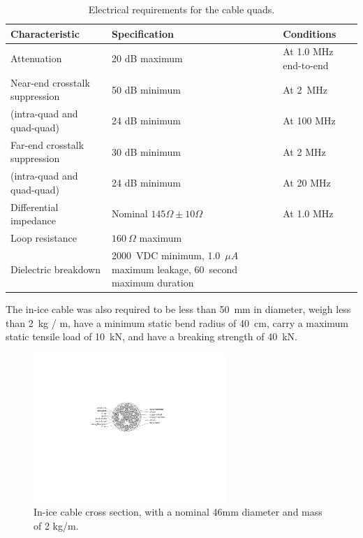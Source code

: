 \begin{table}[h]
  \centering
  \caption{Electrical requirements for the cable quads.} 
  \begin{tabularx}{\textwidth}{ l X  X  }
    \toprule
    Characteristic& Specification & Conditions \\
    \midrule

    Attenuation & 20 dB maximum & At 1.0 MHz end-to-end \\
%

   Near-end crosstalk suppression& 50 dB minimum & At 2~MHz \\
(intra-quad and quad-quad)&24 dB minimum& At 100 MHz\\
   Far-end crosstalk suppression& 30 dB minimum & At 2 MHz \\
(intra-quad and quad-quad)&24 dB minimum& At 20 MHz\\


    Differential impedance & Nominal $145\Omega \pm 10\Omega$ & At 1.0 MHz \\

    Loop resistance & $160~\Omega$ maximum & \\

    Dielectric breakdown & 2000~VDC minimum, 1.0~$\mu A$ maximum leakage, 60~second
    maximum duration & \\
    \bottomrule  
  \end{tabularx}
  \label{tab:quad_requirements}
\end{table}

 The in-ice cable was also required to be less than 50~mm in
 diameter, weigh less than 2~kg / m, have a minimum static bend radius of 40~cm,
 carry a maximum static tensile load of 10~kN, and have a breaking strength
 of 40~kN.
 
\begin{figure}
  \centering
  \includegraphics[width=0.65\textwidth]{graphics/cables/labeled_inice_xsection.pdf}
  \caption{\label{fig:cable_xsection}In-ice cable cross
    section, with a nominal 46mm diameter and mass of 2 kg/m.} 
\end{figure}

